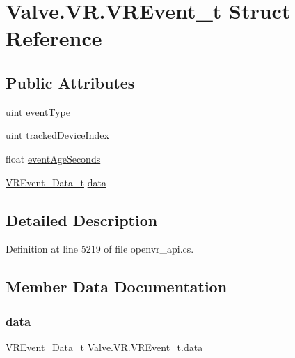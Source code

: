 \hypertarget{struct_valve_1_1_v_r_1_1_v_r_event__t}{}\section{Valve.\+V\+R.\+V\+R\+Event\+\_\+t Struct Reference}
\label{struct_valve_1_1_v_r_1_1_v_r_event__t}
\subsection*{Public Attributes}
\begin{DoxyCompactItemize}
\item 
uint \mbox{\hyperlink{struct_valve_1_1_v_r_1_1_v_r_event__t_a9447b32be6b38b23a8a5c8faa8009041}{event\+Type}}
\item 
uint \mbox{\hyperlink{struct_valve_1_1_v_r_1_1_v_r_event__t_ac4013d3e2c24f26dfd6147e21396fd7e}{tracked\+Device\+Index}}
\item 
float \mbox{\hyperlink{struct_valve_1_1_v_r_1_1_v_r_event__t_a6a76e50c409c51e889447e89685e6757}{event\+Age\+Seconds}}
\item 
\mbox{\hyperlink{struct_valve_1_1_v_r_1_1_v_r_event___data__t}{V\+R\+Event\+\_\+\+Data\+\_\+t}} \mbox{\hyperlink{struct_valve_1_1_v_r_1_1_v_r_event__t_af45efaec7d202da67c2cce7b492bcdb1}{data}}
\end{DoxyCompactItemize}


\subsection{Detailed Description}


Definition at line 5219 of file openvr\+\_\+api.\+cs.



\subsection{Member Data Documentation}
\mbox{\label{struct_valve_1_1_v_r_1_1_v_r_event__t_af45efaec7d202da67c2cce7b492bcdb1}} 
\subsubsection{\texorpdfstring{data}{data}}
{\footnotesize\ttfamily \mbox{\hyperlink{struct_valve_1_1_v_r_1_1_v_r_event___data__t}{V\+R\+Event\+\_\+\+Data\+\_\+t}} Valve.\+V\+R.\+V\+R\+Event\+\_\+t.\+data}




